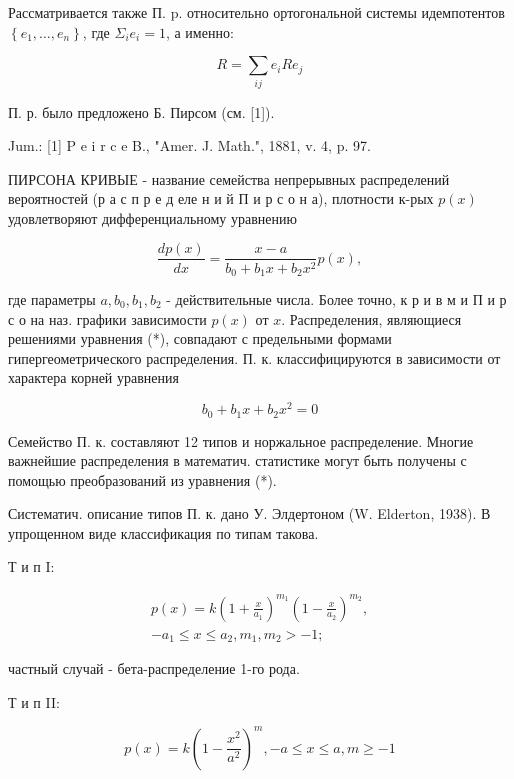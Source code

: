 \documentclass[10pt]{article}
\begin{document}
Рассматривается также П. $\mathrm{p}$. относительно ортогональной системы идемпотентов $\left\{e_{1}, \ldots, e_{n}\right\}$, где $\Sigma_{i} e_{i}=1$, а именно:



\[

R=\sum_{i j} e_{i} R e_{j}

\]



П. р. было предложено Б. Пирсом (см. [1]).



Jum.: [1] P e i r c e B., "Amer. J. Math.", 1881, v. 4, p. 97.



ПИРСОНА КРИВЫЕ - название семейства непрерывных распределений вероятностей (р а с п р е д еле н и й П и р с о н а), плотности к-рых $p(x)$ удовлетворяют дифференциальному уравнению



\[

\frac{d p(x)}{d x}=\frac{x-a}{b_{0}+b_{1} x+b_{2} x^{2}} p(x),

\]



где параметры $a, b_{0}, b_{1}, b_{2}$ - действительные числа. Более точно, к р и в м и П и р с о на наз. графики зависимости $p(x)$ от $x$. Распределения, являющиеся решениями уравнения (*), совпадают с предельными формами гипергеометрического распределения. П. к. классифицируются в зависимости от характера корней уравнения



\[

b_{0}+b_{1} x+b_{2} x^{2}=0

\]



Семейство П. к. составляют 12 типов и норжальное распределение. Многие важнейшие распределения в математич. статистике могут быть получены с помощью преобразований из уравнения (*).



Систематич. описание типов П. к. дано У. Элдертоном (W. Elderton, 1938). В упрощенном виде классификация по типам такова.



Т и п I:



\[

\begin{gathered}

p(x)=k\left(1+\frac{x}{a_{1}}\right)^{m_{1}}\left(1-\frac{x}{a_{2}}\right)^{m_{2}}, \\

-a_{1} \leqslant x \leqslant a_{2}, m_{1}, m_{2}>-1 ;

\end{gathered}

\]



частный случай - бета-распределение 1-го рода.



Т и п II:



\[

p(x)=k\left(1-\frac{x^{2}}{a^{2}}\right)^{m},-a \leqslant x \leqslant a, m \geqslant-1

\]
\end{document}
